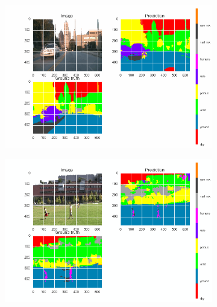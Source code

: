 \begin{figure}[t]
\begin{minipage}[c]{.95\textwidth}
\begin{subfigure}{.47\textwidth}
            \caption{}\label{fig:deconvlstm_gatech_samples:b}
        \end{subfigure}
        \begin{subfigure}{.47\textwidth}
            \centering
            \includegraphics[trim={13 10mm 25mm 5mm},clip,width=\linewidth]{img/deconvLSTM/gatech_24_99-0.png}
            \caption{}\label{fig:deconvlstm_gatech_samples:c}
        \end{subfigure}
        \begin{subfigure}{.47\textwidth}
            \centering
            \includegraphics[trim={13 10mm 25mm 5mm},clip,width=\linewidth]{img/deconvLSTM/gatech_29_69-1.png}
            \caption{}\label{fig:deconvlstm_gatech_samples:d}
        \end{subfigure}
    \end{minipage}%
    \begin{minipage}[c]{.1\textwidth}

\end{minipage}
\end{figure}
